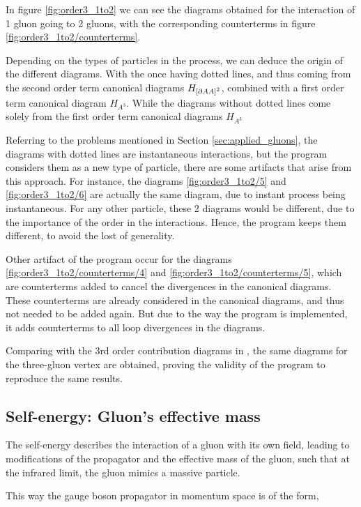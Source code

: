 \documentclass[11pt,a4paper,twoside,pdf]{article}
\numberwithin{equation}{section}
\begin{document}
In figure \ref{fig:order3_1to2} we can see the diagrams obtained for the interaction
of 1 gluon going to 2 gluons, with the corresponding counterterms in figure
\ref{fig:order3_1to2/counterterms}. 

Depending on the types of particles in the process, we can deduce the origin of the 
different diagrams. With the once having dotted lines, and thus coming from the second
order term canonical diagrams $H_{\left[ \partial A A \right]^2}$, combined with a first 
order term canonical diagram $H_{A^3}$. While the diagrams without dotted lines
come solely from the first order term canonical diagrams $H_{A^3}$

Referring to the problems mentioned in Section \ref{sec:applied_gluons}, the diagrams 
with dotted lines are instantaneous interactions, but the program considers them
as a new type of particle, there are some artifacts that arise from this
approach. For instance, the diagrams \ref{fig:order3_1to2/5} and \ref{fig:order3_1to2/6} are actually the same 
diagram, due to instant process being instantaneous. For any other particle, these 
2 diagrams would be different, due to the importance of the order in the interactions.
Hence, the program keeps them different, to avoid the lost of generality.

Other artifact of the program occur for the diagrams \ref{fig:order3_1to2/counterterms/4} and
\ref{fig:order3_1to2/counterterms/5}, which are counterterms added to cancel the divergences
in the canonical diagrams. These counterterms are already considered in the canonical diagrams, 
and thus not needed to be added again. But due to the way the program is implemented,
it adds counterterms to all loop divergences in the diagrams.

Comparing with the 3rd order contribution diagrams in \cite{QCDG}, the same diagrams
for the three-gluon vertex are obtained, proving the validity of the program to reproduce the same results.

\subsection{Self-energy: Gluon's effective mass}

The self-energy describes the interaction of a gluon with its own field, leading to 
modifications of the propagator and the effective mass of the gluon, such that 
at the infrared limit, the gluon mimics a massive particle.

This way the gauge boson propagator in momentum space is of the form, 
\end{document}
